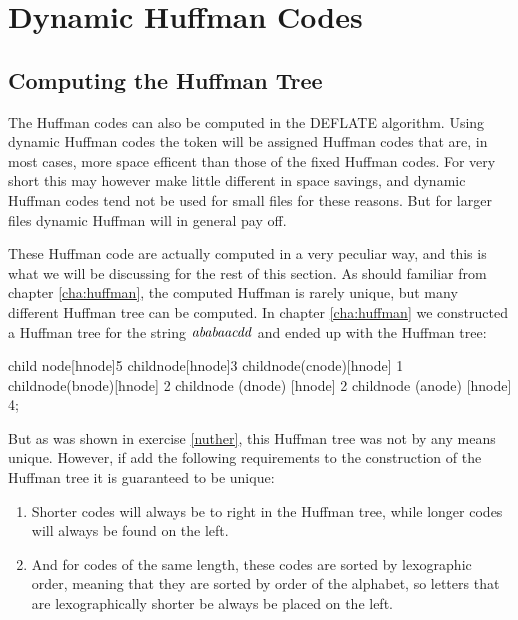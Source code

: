 \section{Dynamic Huffman Codes}

\subsection{Computing the Huffman Tree}

The Huffman codes can also be computed in the DEFLATE algorithm. Using
dynamic Huffman codes the token will be assigned Huffman codes that
are, in most cases, more space efficent than those of the fixed
Huffman codes. For very short this may however make little different
in space savings, and dynamic Huffman codes tend not be used for small
files for these reasons. But for larger files dynamic Huffman will in
general pay off.

These Huffman code are actually computed in a very peculiar way, and
this is what we will be discussing for the rest of this section. As should
familiar from chapter \ref{cha:huffman}, the computed Huffman is
rarely unique, but many different Huffman tree can be computed. In
chapter \ref{cha:huffman} we constructed a Huffman tree for the string
$\mathit{ababaacdd}$ and ended up with the Huffman tree:

\begin{huffmanc}
  child {node[hnode]{5}
    child{node[hnode]{3}
      child{node(cnode)[hnode] {1}}
      child{node(bnode)[hnode] {2}}}
    child{node (dnode) [hnode] {2}}}
  child{node (anode) [hnode] {4}};

\end{huffmanc}

But as was shown in exercise \ref{nuther}, this Huffman tree was not
by any means unique. However, if add the following requirements to the
construction of the Huffman tree it is guaranteed to be unique:

\begin{enumerate}
\item Shorter codes will always be to right in the Huffman tree, while
  longer codes will always be found on the left.
\item And for codes of the same length, these codes are sorted by
  lexographic order, meaning that they are sorted by order of the
  alphabet, so letters that are lexographically shorter be always be
  placed on the left.
\end{enumerate}

